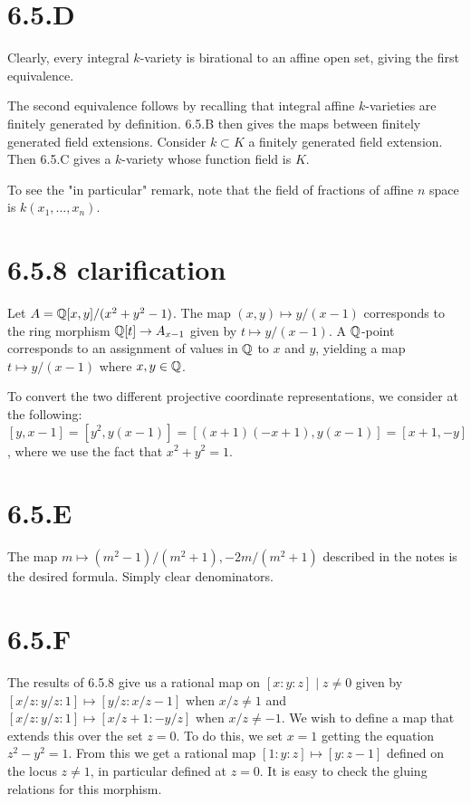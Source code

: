 \documentclass{article}
\begin{document}
\section{6.5.D}
Clearly, every integral $k$-variety is birational to an affine open set, giving the first equivalence.

The second equivalence follows by recalling that integral affine $k$-varieties are finitely generated by definition. 6.5.B then gives the maps between finitely generated field extensions. Consider $k \subset K$ a finitely generated field extension. Then 6.5.C gives a $k$-variety whose function field is $K$.

To see the "in particular" remark, note that the field of fractions of affine $n$ space is $k(x_1,\dots, x_n)$.

\section{6.5.8 clarification}
Let $A=\mathbb{Q}[x,y]/(x^2+y^2-1)$. The map $(x, y) \mapsto y/(x-1)$ corresponds to the ring morphism $\mathbb{Q}[t] \to A_{x-1}$ given by $t \mapsto y/(x-1)$. A $\mathbb{Q}$-point corresponds to an assignment of values in $\mathbb{Q}$ to $x$ and $y$, yielding a map $t \mapsto y/(x-1)$ where $x, y \in \mathbb{Q}$.

To convert the two different projective coordinate representations, we consider at the following: $[y, x-1]=[y^2, y(x-1)]=[(x+1)(-x+1), y(x-1)]=[x+1, -y]$, where we use the fact that $x^2+y^2=1$.

\section{6.5.E}
The map $m \mapsto (m^2-1)/(m^2+1), -2m/(m^2+1)$ described in the notes is the desired formula. Simply clear denominators.

\section{6.5.F}
The results of 6.5.8 give us a rational map on ${[x : y : z] \mid z \neq 0}$ given by $[x/z : y/z : 1] \mapsto [y/z : x/z-1]$ when $x/z \neq 1$ and $[x/z : y/z : 1] \mapsto [x/z+1 : -y/z]$ when $x/z \neq -1$. We wish to define a map that extends this over the set $z=0$. To do this, we set $x=1$ getting the equation $z^2-y^2=1$. From this we get a rational map $[1 : y : z] \mapsto [y : z-1]$ defined on the locus $z \neq 1$, in particular defined at $z=0$. It is easy to check the gluing relations for this morphism.
\end{document}
